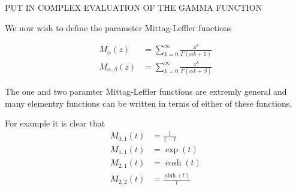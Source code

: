 \documentclass{unswmaths}
\begin{document}
PUT IN COMPLEX EVALUATION OF THE GAMMA FUNCTION

We now wish to define the parameter Mittag-Leffler functions

\begin{unswdef}
	\begin{align}	
		\label{def:Mittag_Leffler_1}
		M_\alpha (z) 		&= \sum_{k=0}^\infty \frac{x^k}{\Gamma(\alpha k + 1)} \\
		\label{def:Mittag_Leffler_2}
		M_{\alpha, \beta}(z) 	&= \sum_{k=0}^\infty \frac{x^k}{\Gamma(\alpha k + \beta)}
	\end{align}
\end{unswdef}

The one and two paramter Mittag-Leffler functions are extremly general and many elementry functions can be written in terms
of either of these functions.

For example it is clear that 
\begin{align*}
	M_{0,1}(t) 	&= \frac{1}{1-t} \\
	M_{1,1}(t)	&= \exp(t) \\
	M_{2,1}(t) 	&= \cosh(t) \\
	M_{2,2}(t)	&= \frac{\sinh(t)}{t}
\end{align*}
\end{document}
